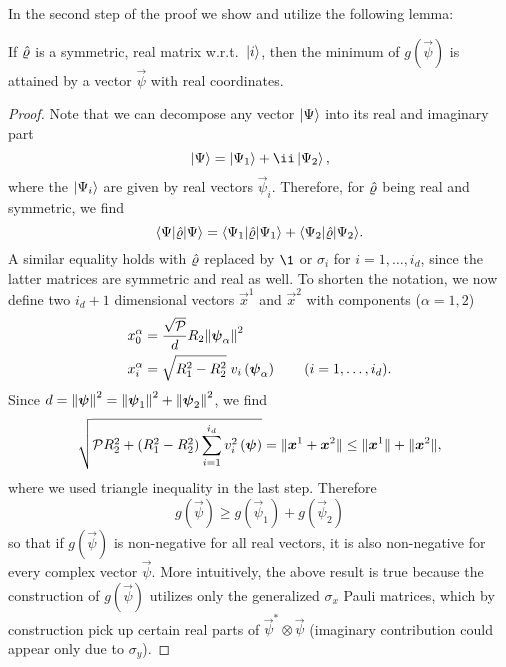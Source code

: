 In the second step of the proof we show and utilize the following lemma:
\begin{lemma}\label{lem:ellpos.real_min}
  If $\hat{\varrho}$ is a symmetric, real matrix w.r.t.\ $\ket{i}$, then the minimum of $g(\vec\psi)$ is attained by a vector $\vec{\psi}$ with real coordinates.
\end{lemma}
\begin{proof}
  Note that we can decompose any vector $\ket\Psi$ into its real and imaginary part
  \begin{equation}
    \ket\Psi = \ket{\Psi_1} + \ii\Ket{\Psi_2},
  \end{equation}
  where the $\ket{\Psi_i}$ are given by real vectors $\vec\psi_i$.
  Therefore, for $\hat{\varrho}$ being real and symmetric, we find
  \begin{equation}
    \bra{\Psi} \estim\varrho \ket{\Psi} = \bra{\Psi_1} \estim\varrho \ket{\Psi_1} + \bra{\Psi_2} \estim\varrho \ket{\Psi_2}.
  \end{equation}
  A similar equality holds with $\hat{\varrho}$ replaced by $\1$ or $\sigma_i$ for $i=1,\ldots,i_d$, since the latter matrices are symmetric and real as well.
  To shorten the notation, we now define two $i_d+1$ dimensional vectors $\vec x^1$ and $\vec x^2$ with components ($\alpha=1,2$)
  \begin{equation}
    \begin{split}
      x^\alpha_0 &= \frac{\sqrt{\mathcal{P}}}{d} R_2 {\Vert{\boldsymbol{\psi}}_\alpha\Vert}^2 \\
      x^\alpha_i &= \sqrt{R_1^2 - R_2^2}\;v_i\left({\boldsymbol{\psi}}_\alpha\right) \qquad (i=1,\ldots,i_d).
    \end{split}
  \end{equation}
  Since $d = {\Vert{\boldsymbol{\psi}}\Vert}^2 = {\Vert{\boldsymbol{\psi}}_1\Vert}^2 + {\Vert{\boldsymbol{\psi}}_2\Vert}^2$, we find
  \begin{equation}
  \sqrt{ \mathcal{P} R_2^2 + (R_1^2 - R_2^2) \sum_{i=1}^{i_d} v_{i}^{2}\left({\boldsymbol{\psi}}\right)} = {\Vert{\boldsymbol{x}}^1 + {\boldsymbol{x}}^2\Vert} \le {\Vert{\boldsymbol{x}}^1\Vert} + {\Vert{\boldsymbol{x}}^2\Vert},
  \end{equation}
  where we used triangle inequality in the last step.
  Therefore
\begin{equation}
 g(\vec\psi) \geq  g(\vec\psi_1) + g(\vec\psi_2)
\end{equation}
so that if  $g(\vec\psi)$ is non-negative for all real vectors, it is also non-negative for every complex vector $\vec\psi$. More intuitively, the above result is true because the construction of $g(\vec\psi)$ utilizes only the generalized $\sigma_x$ Pauli matrices, which by construction pick up certain real parts of $\vec\psi^*\otimes\vec\psi$ (imaginary contribution could appear only due to $\sigma_y$).
\end{proof}

